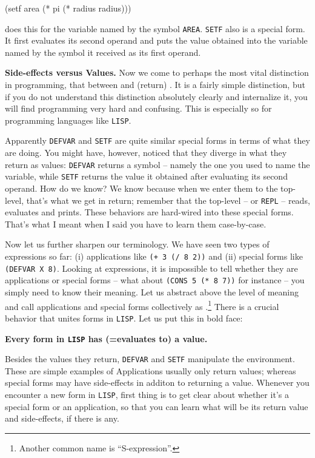 \documentclass[a4paper,11pt]{article}
\begin{document}
\begin{uenum}
\begin{lispcode}
(setf area (* pi (* radius radius)))
\end{lispcode}

does this for the variable named by the symbol \Verb+AREA+. \Verb+SETF+ also is a special form. It first evaluates its second operand and puts the value obtained into the variable named by the symbol it received as its first operand.

\item {\bf Side-effects versus Values.} Now we come to perhaps the most vital distinction in programming, that between  and (return) . It is a fairly simple distinction, but if you do not understand this distinction absolutely clearly and internalize it, you will find programming very hard and confusing. This is especially so for programming languages like \Verb+LISP+.

Apparently \Verb+DEFVAR+ and \Verb+SETF+ are quite similar special forms in terms of what they are doing. You might have, however, noticed that they diverge in what they return as values: \Verb+DEFVAR+ returns a symbol -- namely the one you used to name the variable, while \Verb+SETF+ returns the value it obtained after evaluating its second operand. How do we know? We know because when we enter them to the top-level, that's what we get in return; remember that the top-level -- or \Verb+REPL+ -- reads, evaluates and prints. These behaviors are hard-wired into these special forms. That's what I meant when I said you have to learn them case-by-case.

Now let us further sharpen our terminology. We have seen two types of
expressions so far: (i) applications like \Verb=(+ 3 (/ 8 2))= and
(ii) special forms like \Verb+(DEFVAR X 8)+. Looking at expressions,
it is impossible to tell whether they are applications or special
forms -- what about \Verb+(CONS 5 (* 8 7))+ for instance -- you simply
need to know their meaning. Let us abstract above the level of meaning
and call applications and special forms collectively as
.\footnote{Another common name is ``S-expression''.}
There is a crucial behavior that unites forms in \Verb+LISP+. Let us
put this in bold face:

{\bf Every form in \Verb+LISP+ has (=evaluates to) a value.}

Besides the values they return, \Verb+DEFVAR+ and \Verb+SETF+ manipulate the environment. These are simple examples of  Applications usually only return values; whereas special forms may have side-effects in additon to returning a value. Whenever you encounter a new form in \Verb+LISP+, first thing is to get clear about whether it's a special form or an application, so that you can learn what will be its return value and side-effects, if there is any.


\end{uenum}
\end{document}

